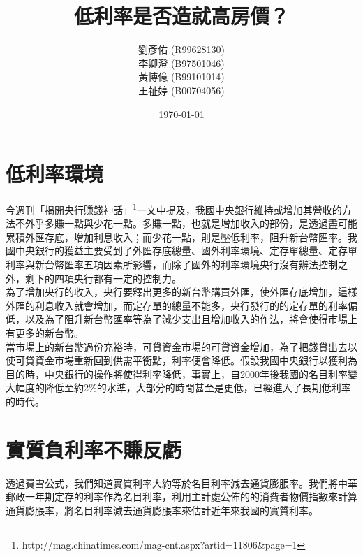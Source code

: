 \documentclass[12pt]{article}
\begin{document}
\begin{CJK}{UTF8}{cwmb}

\title{低利率是否造就高房價？}
\author{劉彥佑 (R99628130)\\
李卿澄 (B97501046)\\
黃博億 (B99101014)\\
王祉婷 (B00704056)}
\date{\today}


\maketitle

\section{低利率環境}

今週刊「揭開央行賺錢神話」\footnote{http://mag.chinatimes.com/mag-cnt.aspx?artid=11806\&page=1}一文中提及，我國中央銀行維持或增加其營收的方法不外乎多賺一點與少花一點。多賺一點，也就是增加收入的部份，是透過盡可能累積外匯存底，增加利息收入；而少花一點，則是壓低利率，阻升新台幣匯率。我國中央銀行的獲益主要受到了外匯存底總量、國外利率環境、定存單總量、定存單利率與新台幣匯率五項因素所影響，而除了國外的利率環境央行沒有辦法控制之外，剩下的四項央行都有一定的控制力。\\

為了增加央行的收入，央行要釋出更多的新台幣購買外匯，使外匯存底增加，這樣外匯的利息收入就會增加，而定存單的總量不能多，央行發行的的定存單的利率偏低，以及為了阻升新台幣匯率等為了減少支出且增加收入的作法，將會使得市場上有更多的新台幣。\\

當市場上的新台幣過份充裕時，可貸資金市場的可貸資金增加，為了把錢貸出去以使可貸資金市場重新回到供需平衡點，利率便會降低。假設我國中央銀行以獲利為目的時，中央銀行的操作將使得利率降低，事實上，自2000年後我國的名目利率變大幅度的降低至約2\%的水準，大部分的時間甚至是更低，已經進入了長期低利率的時代。

\section{實質負利率不賺反虧}

透過費雪公式，我們知道實質利率大約等於名目利率減去通貨膨脹率。我們將中華郵政一年期定存的利率作為名目利率，利用主計處公佈的的消費者物價指數來計算通貨膨脹率，將名目利率減去通貨膨脹率來估計近年來我國的實質利率。\\


\end{CJK}
\end{document}
